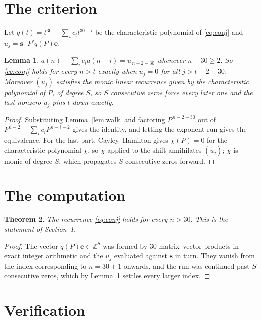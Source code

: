 \documentclass[11pt,a4paper]{article}
\theoremstyle{plain}
\newtheorem{theorem}{Theorem}
\newtheorem{lemma}[theorem]{Lemma}
\theoremstyle{definition}
\begin{document}
\section{The criterion}

Let $q(t)=t^{30}-\sum_i c_i t^{30-i}$ be the characteristic polynomial of
\eqref{eq:conj} and $u_j=\mathbf{s}^{\!\top}P^{j}q(P)\mathbf{e}$.

\begin{lemma}\label{lem:crit}
$a(n)-\sum_i c_i a(n-i)=u_{\,n-2-30}$ whenever $n-30\ge2$. So \eqref{eq:conj}
holds for every $n>t$ exactly when $u_j=0$ for all $j>t-2-30$. Moreover $(u_j)$
satisfies the monic linear recurrence given by the characteristic polynomial of $P$, of
degree $S$, so $S$ consecutive zeros force every later one and the last nonzero $u_j$ pins
$t$ down exactly.
\end{lemma}

\begin{proof}
Substituting Lemma~\ref{lem:walk} and factoring $P^{\,n-2-30}$ out of
$P^{n-2}-\sum_i c_i P^{n-i-2}$ gives the identity, and letting the exponent run gives the
equivalence. For the last part, Cayley--Hamilton gives $\chi(P)=0$ for the characteristic
polynomial $\chi$, so $\chi$ applied to the shift annihilates $(u_j)$; $\chi$ is monic of
degree $S$, which propagates $S$ consecutive zeros forward.
\end{proof}

\section{The computation}

\begin{theorem}
The recurrence \eqref{eq:conj} holds for every $n>30$. This is the statement of
Section~1.
\end{theorem}

\begin{proof}
The vector $q(P)\mathbf{e}\in\mathbb{Z}^{S}$ was formed by $30$ matrix--vector
products in exact integer arithmetic and the $u_j$ evaluated against $\mathbf{s}$ in turn.
They vanish from the index corresponding to $n=30+1$ onwards, and the run was continued
past $S$ consecutive zeros, which by Lemma~\ref{lem:crit} settles every larger index.
\end{proof}

\section{Verification}
\end{document}
